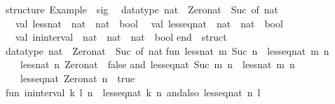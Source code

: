 \begin{isabellebody}
\endisatagquotett
{\isafoldquotett}%
%
\isadelimquotett
%
\endisadelimquotett
%
\isadelimquotetypewriter
%
\endisadelimquotetypewriter
%
\isatagquotetypewriter
%
\begin{isamarkuptext}%
structure\ Example\ {}\ sig\isanewline
\ \ datatype\ nat\ {}\ Zero{}nat\ {}\ Suc\ of\ nat\isanewline
\ \ val\ less{}nat\ {}\ nat\ {}{}\ nat\ {}{}\ bool\isanewline
\ \ val\ less{}eq{}nat\ {}\ nat\ {}{}\ nat\ {}{}\ bool\isanewline
\ \ val\ in{}interval\ {}\ nat\ {}\ nat\ {}{}\ nat\ {}{}\ bool\isanewline
end\ {}\ struct\isanewline
\isanewline
datatype\ nat\ {}\ Zero{}nat\ {}\ Suc\ of\ nat{}\isanewline
\isanewline
fun\ less{}nat\ m\ {}Suc\ n{}\ {}\ less{}eq{}nat\ m\ n\isanewline
\ \ {}\ less{}nat\ n\ Zero{}nat\ {}\ false\isanewline
and\ less{}eq{}nat\ {}Suc\ m{}\ n\ {}\ less{}nat\ m\ n\isanewline
\ \ {}\ less{}eq{}nat\ Zero{}nat\ n\ {}\ true{}\isanewline
\isanewline
fun\ in{}interval\ {}k{}\ l{}\ n\ {}\ less{}eq{}nat\ k\ n\ andalso\ less{}eq{}nat\ n\ l{}\isanewline

\end{isamarkuptext}
\end{isabellebody}
